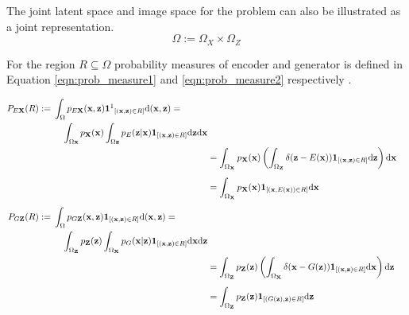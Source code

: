{The joint latent space and image space for the problem can also be illustrated as a joint
representation.
$$
\Omega := \Omega_{X} \times \Omega_{Z}
$$

For the region $R \subseteq \Omega$ probability
measures \cite{RePEc:eee:csdana:v:20:y:1995:i:6:p:703-702} of encoder and generator is defined in
Equation \ref{eqn:prob_measure1} and \ref{eqn:prob_measure2} respectively \cite{Donahue2017AdversarialFL}.

 \begin{align}
    \begin{split}\label{eqn:prob_measure1}
    P_{E \mathbf{X}}(R)  :={}&\int_{\Omega} p_{E \mathbf{X}}(\mathbf{x}, \mathbf{z})
    \mathbf{1\footnotemark}_{[(\mathbf{x}, \mathbf{z}) \in R]} \mathrm{d}(\mathbf{x}, \mathbf{z})= \\ 
    & \quad \int_{\Omega \mathbf{x}} p_{\mathbf{X}}(\mathbf{x}) \int_{\Omega \mathbf{z}} p_{E}(\mathbf{z} | \mathbf{x})
    \mathbf{1}_{[(\mathbf{x}, \mathbf{z}) \in R]} \mathrm{d} \mathbf{z} \mathrm{d} \mathbf{x}       
    \end{split}\\
    {}&=\int_{\Omega_{\mathbf{X}}} p_{\mathbf{X}}(\mathbf{x})\left(\int_{\Omega_{\mathbf{Z}}} \delta(\mathbf{z}-E(\mathbf{x})) \mathbf{1}_{[(\mathbf{x}, \mathbf{z}) \in R]} \mathrm{d} \mathbf{z}\right) \mathrm{d} \mathbf{x} \\[5pt]
    {}& =\int_{\Omega_{\mathbf{X}}} p_{\mathbf{X}}(\mathbf{x}) \mathbf{1}_{[(\mathbf{x}, E(\mathbf{x})) \in R]} \mathrm{d} \mathbf{x} \\[5pt]
    \begin{split}\label{eqn:prob_measure2}
    P_{G \mathbf{Z}}(R) :={}&\int_{\Omega} p_{G \mathbf{Z}}(\mathbf{x}, \mathbf{z}) 
    \mathbf{1}_{[(\mathbf{x},\mathbf{z}) \in R]} \mathrm{d}(\mathbf{x}, \mathbf{z})= \\ 
    & \quad \int_{\Omega_{\mathbf{Z}}} p_{\mathbf{Z}}(\mathbf{z}) \int_{\Omega_{\mathbf{X}}} p_{G}(\mathbf{x} | \mathbf{z})
    \mathbf{1}_{[(\mathbf{x}, \mathbf{z}) \in R]} \mathrm{d} \mathbf{x} \mathrm{d} \mathbf{z} 
    \end{split}\\
    {}&=\int_{\Omega_{\mathbf{Z}}} p_{\mathbf{Z}}(\mathbf{z})\left(\int_{\Omega_{\mathbf{X}}} \delta(\mathbf{x}-G(\mathbf{z})) \mathbf{1}_{[(\mathbf{x}, \mathbf{z}) \in R]} \mathrm{d} \mathbf{x}\right) \mathrm{d} \mathbf{z} \\[5pt]
    {}& =\int_{\Omega_{\mathbf{Z}}} p_{\mathbf{Z}}(\mathbf{z}) \mathbf{1}_{[(G(\mathbf{z}), \mathbf{z}) \in R]} \mathrm{d} \mathbf{z}
\end{align}        

}
